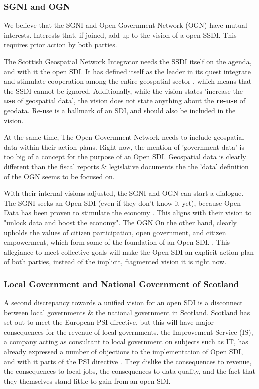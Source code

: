 \subsubsection{SGNI and OGN}

We believe that the SGNI and Open Government Network (OGN) have mutual interests. Interests that, if joined, add up to the vision of a open SSDI. This requires prior action by both parties. 

The Scottish Geospatial Network Integrator needs the SSDI itself on the agenda, and with it the open SDI. It has defined itself as the leader in its quest integrate and stimulate cooperation among the entire geospatial sector \citep[SGNI]{scottish_geospatial_network_integrator}, which means that the SSDI cannot be ignored. Additionally, while the vision states 'increase the \textbf{use} of geospatial data', the vision does not state anything about the \textbf{re-use} of geodata. Re-use is a hallmark of an SDI, and should also be included in the vision. 

At the same time, The Open Government Network needs to include geospatial data within their action plans. Right now, the mention of 'government data' is too big of a concept for the purpose of an Open SDI. Geospatial data is clearly different than the fiscal reports \& legislative documents the the 'data' definition of the OGN seems to be focused on. 

With their internal visions adjusted, the SGNI and OGN can start a dialogue. The SGNI seeks an Open SDI (even if they don't know it yet), because Open Data has been proven to stimulate the economy \citep{eucommission_psiToOpen}. This aligns with their vision to "unlock data and boost the economy". The OGN On the other hand, clearly upholds the values of citizen participation, open government, and citizen empowerment, which form some of the foundation of an Open SDI. \citep{opengovpartnership_mainpage} \citep{towards_user_oriented_open_data_strateg_2018}. This allegiance to meet collective goals will make the Open SDI an explicit action plan of both parties, instead of the implicit, fragmented vision it is right now.   


\subsubsection{Local Government and National Government of Scotland}

A second discrepancy towards a unified vision for an open SDI is a disconnect between local governments \& the national government in Scotland. Scotland has set out to meet the European PSI directive, but this will have major consequences for the revenue of local governments. the Improvement Service (IS), a company acting as  consultant to local government on subjects such as IT, has already expressed a number of objections to the implementation of Open SDI, and with it parts of the PSI directive \citep{IS_local_SSDI}. They dislike the consequences to revenue, the consequences to local jobs, the consequences to data quality, and the fact that they themselves stand little to gain from an open SDI. 

